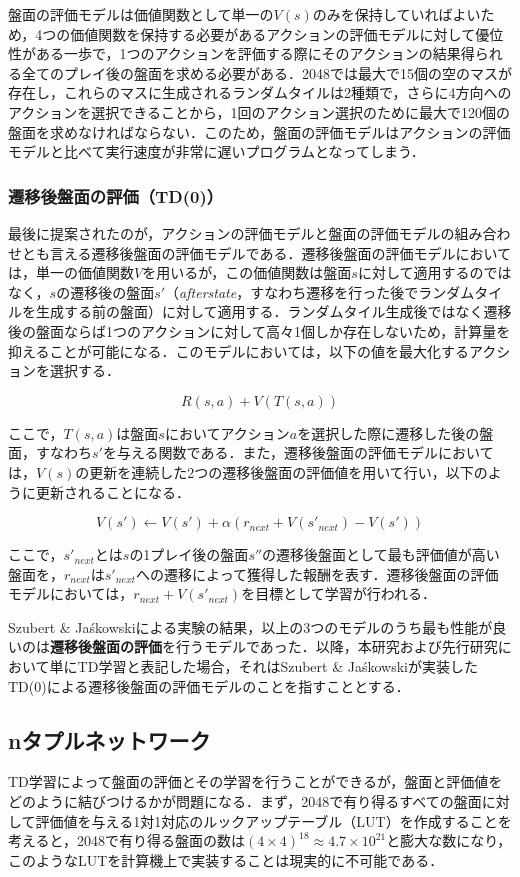 \documentclass{suribt}
\begin{document}
盤面の評価モデルは価値関数として単一の$V(s)$のみを保持していればよいため，4つの価値関数を保持する必要があるアクションの評価モデルに対して優位性がある一歩で，1つのアクションを評価する際にそのアクションの結果得られる全てのプレイ後の盤面を求める必要がある．2048では最大で15個の空のマスが存在し，これらのマスに生成されるランダムタイルは2種類で，さらに4方向へのアクションを選択できることから，1回のアクション選択のために最大で120個の盤面を求めなければならない．このため，盤面の評価モデルはアクションの評価モデルと比べて実行速度が非常に遅いプログラムとなってしまう．

\subsubsection{遷移後盤面の評価（TD(0)）}
最後に提案されたのが，アクションの評価モデルと盤面の評価モデルの組み合わせとも言える遷移後盤面の評価モデルである．遷移後盤面の評価モデルにおいては，単一の価値関数$V$を用いるが，この価値関数は盤面$s$に対して適用するのではなく，$s$の遷移後の盤面$s'$（\textit{afterstate}，すなわち遷移を行った後でランダムタイルを生成する前の盤面）に対して適用する．ランダムタイル生成後ではなく遷移後の盤面ならば1つのアクションに対して高々1個しか存在しないため，計算量を抑えることが可能になる．このモデルにおいては，以下の値を最大化するアクションを選択する．

\[
	R(s,a) + V(T(s,a))
\]

ここで，$T(s,a)$は盤面$s$においてアクション$a$を選択した際に遷移した後の盤面，すなわち$s'$を与える関数である．また，遷移後盤面の評価モデルにおいては，$V(s)$の更新を連続した2つの遷移後盤面の評価値を用いて行い，以下のように更新されることになる．

\[
	V(s') \leftarrow V(s') + \alpha (r_{next} + V(s'_{next}) - V(s') )
\]

ここで，$s'_{next}$とは$s$の1プレイ後の盤面$s''$の遷移後盤面として最も評価値が高い盤面を，$r_{next}$は$s'_{next}$への遷移によって獲得した報酬を表す．遷移後盤面の評価モデルにおいては，$r_{next}+V(s'_{next})$を目標として学習が行われる．

Szubert \& Ja\'{s}kowskiによる実験の結果，以上の3つのモデルのうち最も性能が良いのは\textbf{遷移後盤面の評価}を行うモデルであった．以降，本研究および先行研究において単にTD学習と表記した場合，それはSzubert \& Ja\'{s}kowskiが実装したTD(0)による遷移後盤面の評価モデルのことを指すこととする．

\subsection{nタプルネットワーク}
TD学習によって盤面の評価とその学習を行うことができるが，盤面と評価値をどのように結びつけるかが問題になる．まず，2048で有り得るすべての盤面に対して評価値を与える1対1対応のルックアップテーブル（LUT）を作成することを考えると，2048で有り得る盤面の数は$(4 \times 4)^{18} \approx 4.7 \times 10^{21}$と膨大な数になり，このようなLUTを計算機上で実装することは現実的に不可能である．
\end{document}

